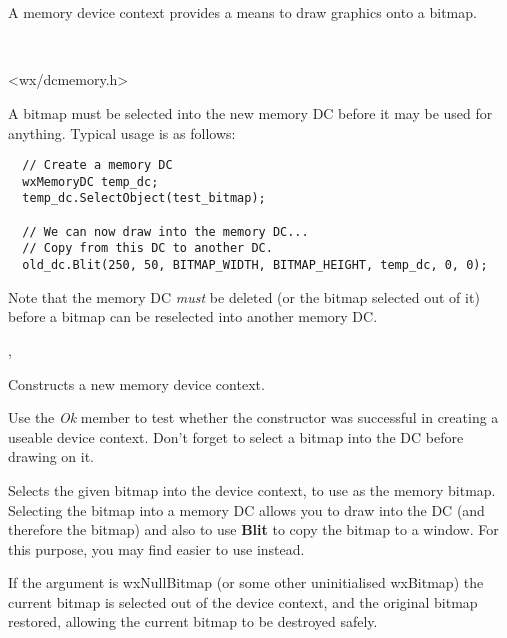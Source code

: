 \section{}\label{wxmemorydc}

A memory device context provides a means to draw graphics onto a bitmap.


\\


<wx/dcmemory.h>


A bitmap must be selected into the new memory DC before it may be used
for anything.  Typical usage is as follows:

\begin{verbatim}
  // Create a memory DC
  wxMemoryDC temp_dc;
  temp_dc.SelectObject(test_bitmap);

  // We can now draw into the memory DC...
  // Copy from this DC to another DC.
  old_dc.Blit(250, 50, BITMAP_WIDTH, BITMAP_HEIGHT, temp_dc, 0, 0);
\end{verbatim}

Note that the memory DC {\it must} be deleted (or the bitmap selected out of it) before a bitmap
can be reselected into another memory DC.


, 




Constructs a new memory device context.

Use the {\it Ok} member to test whether the constructor was successful
in creating a useable device context. Don't forget to select a bitmap
into the DC before drawing on it.



Selects the given bitmap into the device context, to use as the memory
bitmap. Selecting the bitmap into a memory DC allows you to draw into
the DC (and therefore the bitmap) and also to use {\bf Blit} to copy
the bitmap to a window. For this purpose, you may find \rtfsp
easier to use instead.

If the argument is wxNullBitmap (or some other uninitialised wxBitmap) the current bitmap is selected out of the device
context, and the original bitmap restored, allowing the current bitmap to
be destroyed safely.

